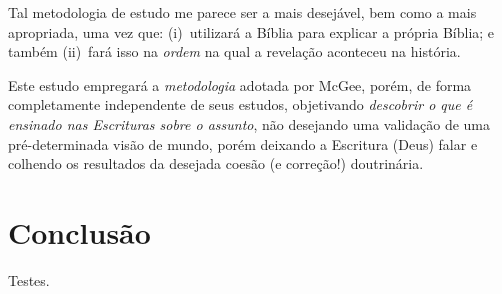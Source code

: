     Tal metodologia de estudo me parece ser a mais desejável, bem como a mais apropriada, uma vez que:  (i)~utilizará  a  Bíblia
    para explicar a própria Bíblia; e também (ii)~fará isso na \emph{ordem} na qual a revelação aconteceu na história.

    Este estudo empregará a \emph{metodologia} adotada por McGee, porém, de forma completamente independente  de  seus  estudos,
    objetivando \emph{descobrir o que é  ensinado  nas  Escrituras  sobre  o  assunto},  não  desejando  uma  validação  de  uma
    pré-determinada visão de mundo, porém deixando a Escritura (Deus) falar e colhendo  os  resultados  da  desejada  coesão  (e
    correção!) doutrinária.



\section{Conclusão}

    Testes.

